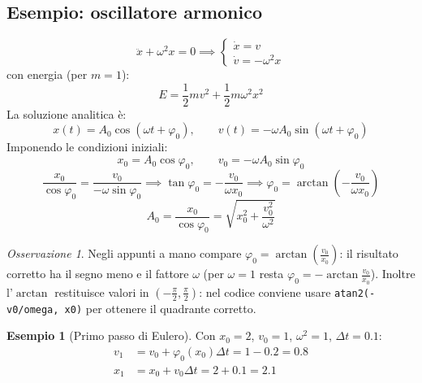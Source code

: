 \documentclass[11pt, a4paper, openright]{book}
\theoremstyle{plain}
\theoremstyle{definition}
\newtheorem{esempio}[teorema]{Esempio}
\theoremstyle{remark}
\newtheorem{osservazione}[teorema]{Osservazione}
\begin{document}
\subsection{Esempio: oscillatore armonico}
\begin{equation}
    \ddot{x} + \omega^2x = 0 \implies \begin{cases}
        \dot{x} = v \\
        \dot{v} = -\omega^2x
    \end{cases}
\end{equation}
con energia (per $m = 1$):
\begin{equation}
    E = \frac{1}{2}mv^2 + \frac{1}{2}m\omega^2x^2
\end{equation}
La soluzione analitica è:
\begin{equation}
    x(t) = A_0\cos(\omega t + \varphi_0), \qquad v(t) = -\omega A_0\sin(\omega t + \varphi_0)
\end{equation}
Imponendo le condizioni iniziali:
\begin{equation}
    x_0 = A_0\cos\varphi_0, \qquad v_0 = -\omega A_0\sin\varphi_0
\end{equation}
\begin{equation}
    \frac{x_0}{\cos\varphi_0} = \frac{v_0}{-\omega\sin\varphi_0} \implies \tan\varphi_0 = -\frac{v_0}{\omega x_0} \implies \varphi_0 = \arctan\left(-\frac{v_0}{\omega x_0}\right)
\end{equation}
\begin{equation}
    A_0 = \frac{x_0}{\cos\varphi_0} = \sqrt{x_0^2 + \frac{v_0^2}{\omega^2}}
\end{equation}
\begin{osservazione}
    Negli appunti a mano compare $\varphi_0 = \arctan\left(\frac{v_0}{x_0}\right)$: il risultato corretto ha il segno meno e il fattore $\omega$ (per $\omega = 1$ resta $\varphi_0 = -\arctan\frac{v_0}{x_0}$). Inoltre l'$\arctan$ restituisce valori in $\left(-\frac{\pi}{2}, \frac{\pi}{2}\right)$: nel codice conviene usare \texttt{atan2(-v0/omega, x0)} per ottenere il quadrante corretto.
\end{osservazione}

\begin{esempio}[Primo passo di Eulero]
    Con $x_0 = 2$, $v_0 = 1$, $\omega^2 = 1$, $\Delta t = 0.1$:
    \begin{align}
        v_1 &= v_0 + \varphi_0(x_0)\Delta t = 1 - 0.2 = 0.8 \\
        x_1 &= x_0 + v_0\Delta t = 2 + 0.1 = 2.1
    \end{align}
\end{esempio}
\end{document}
